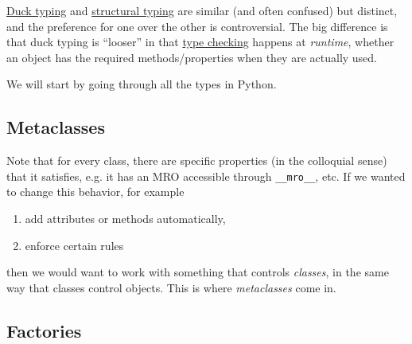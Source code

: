   \hyperref[def:duck-typing]{Duck typing} and \hyperref[def:structural-typing]{structural typing} are similar (and often confused) but distinct, and the preference for one over the other is controversial. The big difference is that duck typing is ``looser'' in that \hyperref[def:type-checking]{type checking} happens at \textit{runtime}, whether an object has the required methods/properties when they are actually used. 

  We will start by going through all the types in Python. 

\subsection{Metaclasses} 

  Note that for every class, there are specific properties (in the colloquial sense) that it satisfies, e.g. it has an MRO accessible through \texttt{\_\_mro\_\_}, etc. If we wanted to change this behavior, for example 
  \begin{enumerate}
    \item add attributes or methods automatically, 
    \item enforce certain rules 
  \end{enumerate}
  then we would want to work with something that controls \textit{classes}, in the same way that classes control objects. This is where \textit{metaclasses} come in. 


\subsection{Factories}

